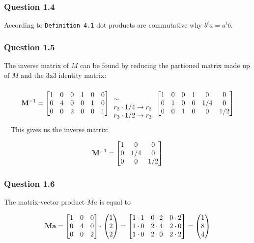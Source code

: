 \documentclass{article}
\begin{document}
\subsubsection*{Question 1.4}
According to \cite{algebra} \texttt{Definition 4.1} dot products are commutative why \(b^ta = a^tb\).

\subsubsection*{Question 1.5}
The inverse matrix of \(M\) can be found by reducing the partioned matrix made up of \(M\) and the 3x3 identity matrix:

\[
{{\mathbf M}}^{-1} = 
\begin{bmatrix}
1 & 0 & 0 & 1 & 0 & 0 \\
0 & 4 & 0 & 0 & 1 & 0 \\
0 & 0 & 2 & 0 & 0 & 1
\end{bmatrix}
\begin{array}{l}
\\
\sim \\
r_2 \cdot 1/4 \rightarrow r_2 \\
r_3 \cdot 1/2 \rightarrow r_3
\end{array}
\begin{bmatrix}
1 & 0 & 0 & 1 & 0 & 0 \\
0 & 1 & 0 & 0 & 1/4 & 0 \\
0 & 0 & 1 & 0 & 0 & 1/2
\end{bmatrix}
\]
\
\
This gives us the inverse matrix:

\[
{{\mathbf M}}^{-1} = 
\begin{bmatrix}
1 & 0 & 0 \\
0 & 1/4 & 0 \\
0 & 0 & 1/2
\end{bmatrix}
\]

\subsubsection*{Question 1.6}
The matrix-vector product \(Ma\) is equal to

\[
{\mathbf M} {\mathbf a} = 
\begin{bmatrix}
1 & 0 & 0 \\
0 & 4 & 0 \\
0 & 0 & 2
\end{bmatrix} \cdot
\begin{pmatrix}1\\2\\2\end{pmatrix} =
\begin{bmatrix}
1 \cdot 1 & 0 \cdot 2 & 0 \cdot 2 \\
1 \cdot 0 & 2 \cdot 4 & 2 \cdot 0 \\
1 \cdot 0 & 2 \cdot 0 & 2 \cdot 2
\end{bmatrix} =
\begin{pmatrix}1\\8\\4\end{pmatrix}
\]
\end{document}
